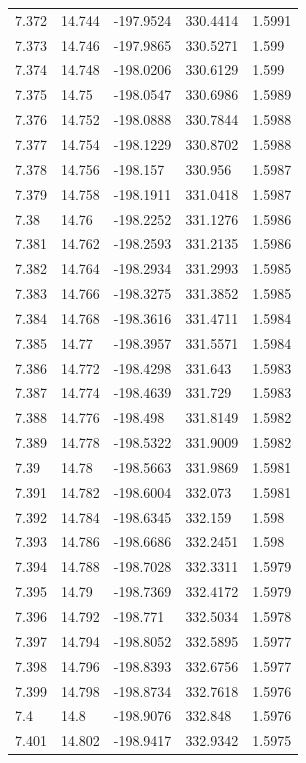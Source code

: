 \begin{tabular}{lllll}
7.372 & 14.744 & -197.9524 & 330.4414 & 1.5991 \\
7.373 & 14.746 & -197.9865 & 330.5271 & 1.599 \\
7.374 & 14.748 & -198.0206 & 330.6129 & 1.599 \\
7.375 & 14.75 & -198.0547 & 330.6986 & 1.5989 \\
7.376 & 14.752 & -198.0888 & 330.7844 & 1.5988 \\
7.377 & 14.754 & -198.1229 & 330.8702 & 1.5988 \\
7.378 & 14.756 & -198.157 & 330.956 & 1.5987 \\
7.379 & 14.758 & -198.1911 & 331.0418 & 1.5987 \\
7.38 & 14.76 & -198.2252 & 331.1276 & 1.5986 \\
7.381 & 14.762 & -198.2593 & 331.2135 & 1.5986 \\
7.382 & 14.764 & -198.2934 & 331.2993 & 1.5985 \\
7.383 & 14.766 & -198.3275 & 331.3852 & 1.5985 \\
7.384 & 14.768 & -198.3616 & 331.4711 & 1.5984 \\
7.385 & 14.77 & -198.3957 & 331.5571 & 1.5984 \\
7.386 & 14.772 & -198.4298 & 331.643 & 1.5983 \\
7.387 & 14.774 & -198.4639 & 331.729 & 1.5983 \\
7.388 & 14.776 & -198.498 & 331.8149 & 1.5982 \\
7.389 & 14.778 & -198.5322 & 331.9009 & 1.5982 \\
7.39 & 14.78 & -198.5663 & 331.9869 & 1.5981 \\
7.391 & 14.782 & -198.6004 & 332.073 & 1.5981 \\
7.392 & 14.784 & -198.6345 & 332.159 & 1.598 \\
7.393 & 14.786 & -198.6686 & 332.2451 & 1.598 \\
7.394 & 14.788 & -198.7028 & 332.3311 & 1.5979 \\
7.395 & 14.79 & -198.7369 & 332.4172 & 1.5979 \\
7.396 & 14.792 & -198.771 & 332.5034 & 1.5978 \\
7.397 & 14.794 & -198.8052 & 332.5895 & 1.5977 \\
7.398 & 14.796 & -198.8393 & 332.6756 & 1.5977 \\
7.399 & 14.798 & -198.8734 & 332.7618 & 1.5976 \\
7.4 & 14.8 & -198.9076 & 332.848 & 1.5976 \\
7.401 & 14.802 & -198.9417 & 332.9342 & 1.5975 \\

\end{tabular}
